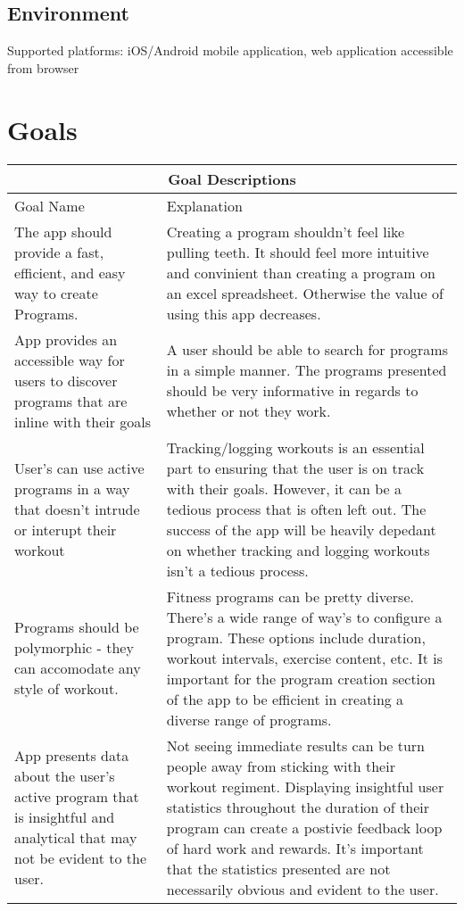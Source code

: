 \documentclass{article}
\begin{document}
\subsection{Environment}
Supported platforms: iOS/Android mobile application, web application accessible from browser


\section{Goals}

\begin{tabular}{ |p{5cm}|p{8cm}| }
	\hline
	\multicolumn{2}{|c|}{Goal Descriptions } \\
	\hline
	Goal Name & Explanation \\
	\hline
	The app should provide a fast, efficient, and easy way to create Programs. & Creating a program shouldn't feel like pulling teeth. It should feel more intuitive and convinient than creating a program on an excel spreadsheet. Otherwise the value of using this app decreases.  \\
	\hline
	App provides an accessible way for users to discover programs that are inline with their goals & A user should be able to search for programs in a simple manner. The programs presented should be very informative in regards to whether or not they work. \\
	\hline
	User's can use active programs in a way that doesn't intrude or interupt their workout & Tracking/logging workouts is an essential part to ensuring that the user is on track with their goals. However, it can be a tedious process that is often left out. The success of the app will be heavily depedant on whether tracking and logging workouts isn't a tedious process. \\
	\hline
	Programs should be polymorphic - they can accomodate any style of workout. & Fitness programs can be pretty diverse. There's a wide range of way's to configure a program. These options include duration, workout intervals, exercise content, etc. It is important for the program creation section of the app to be efficient in creating a diverse range of programs. \\
  \hline
	App presents data about the user's active program that is insightful and analytical that may not be evident to the user. & Not seeing immediate results can be turn people away from sticking with their workout regiment. Displaying insightful user statistics throughout the duration of their program can create a postivie feedback loop of hard work and rewards. It's important that the statistics presented are not necessarily obvious and evident to the user.   \\
	\hline
\end{tabular}
\end{document}
